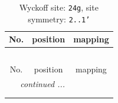 \documentclass[fleqn,8pt]{jsarticle}
\begin{document}
\renewcommand{\arraystretch}{1.2}
\begin{longtable}{ccc}
\caption{Wyckoff site: {\tt 24g}, site symmetry: {\tt 2..1'}}
 \\
 \hline \hline
No. & position & mapping \\ \hline \endfirsthead

\multicolumn{2}{l}{\tablename\ \thetable{}} \\
 \hline \hline
No. & position & mapping \\ \hline \endhead

 \hline \hline
\multicolumn{2}{r}{\footnotesize\it continued ...} \\ \endfoot

 \hline \hline
\multicolumn{2}{r}{} \\ \endlastfoot


\end{longtable}
\end{document}
